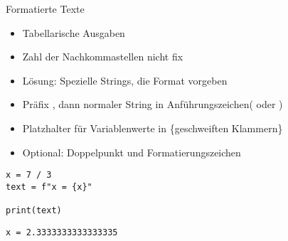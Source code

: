 
\begin{frame}[fragile]{Formatierte Texte}
%
\begin{itemize}
\item Tabellarische Ausgaben
\item Zahl der Nachkommastellen nicht fix
\item Lösung: Spezielle Strings, die Format vorgeben
\item Präfix , dann normaler String in Anführungszeichen( oder )
\item Platzhalter für Variablenwerte in \{geschweiften Klammern\}
\item Optional: Doppelpunkt und Formatierungszeichen
\end{itemize}
%
\begin{minipage}[t]{.49\linewidth}
\phantom{x}
\begin{codebox}
\begin{verbatim}
x = 7 / 3
text = f"x = {x}"

print(text)
\end{verbatim}
\end{codebox}
\end{minipage}
%
\begin{minipage}[t]{.49\linewidth}
\phantom{x}
\begin{cmdbox}
\begin{verbatim}
x = 2.3333333333333335
\end{verbatim}
\end{cmdbox}
\end{minipage}
%
\end{frame}



